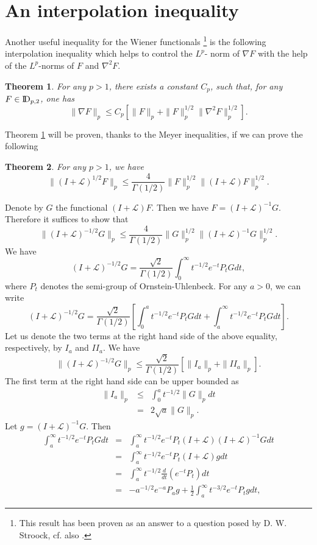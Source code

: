 \documentclass[12pt,a4paper]{book}
\newtheorem{theorem}{Theorem}[section]
\newcommand{\DD}{{\rm I\!D}}
\newcommand{\proof}{\noindent {\bf Proof:\ }}
\begin{document}

\section{An interpolation inequality}
Another useful inequality for the Wiener functionals \footnote{This
  result has been proven as an answer to a question posed by
  D. W. Stroock, cf. also \cite{D-H-U}.} is the following
interpolation inequality which helps to control the $L^p$- norm of
$\nabla F$ with the help of the $L^p$-norms of $F$ and
$\nabla^2 F$.
\begin{theorem}
\label{inter-th}
For any $p>1$, there exists a constant $C_p$, such that, for any $F\in \DD_{p,2}$, one has
$$
\|\nabla F\|_p\leq C_p\left[\|F\|_p+\|F\|_p^{1/2}\|\nabla^2F\|_p^{1/2}\right].
$$
\end{theorem}
Theorem \ref{inter-th}  will be proven, thanks to  the Meyer
inequalities, if we can  prove the following
\begin{theorem}
\label{th6}
For any $p>1$, we have
$$
\|(I+{\mathcal L})^{1/2}F\|_p\leq \frac{4}{\Gamma(1/2)}
  \|F\|_p^{1/2}\|(I+{\mathcal L})F\|^{1/2}_p.
$$
\end{theorem}
\proof
Denote by $G$ the functional $(I+{\mathcal L})F$. Then we have
$F=(I+{\mathcal L})^{-1}G$. Therefore it suffices to show that
$$
\|(I+{\mathcal L})^{-1/2}G\|_p\leq  \frac{4}{\Gamma(1/2)}
\|G\|^{1/2}_p\|(I+{\mathcal L})^{-1}G\|^{1/2}_p.
$$
We have
$$
(I+{\mathcal L})^{-1/2}G=\frac{\sqrt{2}}{\Gamma(1/2)}\int_0^\infty
t^{-1/2}e^{-t}P_t G dt,
$$
where $P_t$ denotes the semi-group of Ornstein-Uhlenbeck. For any
$a>0$, we can write
$$
(I+{\mathcal L})^{-1/2}G=\frac{\sqrt{2}}{\Gamma(1/2)}\left[\int_0^a
t^{-1/2}e^{-t}P_t G dt+\int_a^\infty t^{-1/2}e^{-t}P_t G dt\right].
$$
Let us denote the two terms at the right hand side of the above
equality, respectively, by $I_a$ and $II_a$. We have
$$
\|(I+{\mathcal L})^{-1/2}G\|_p\leq \frac{\sqrt{2}}{\Gamma(1/2)}
[\|I_a\|_p+\|II_a\|_p].
$$
The first term at the right hand side can be upper bounded  as
\begin{eqnarray*}
\|I_a\|_p&\leq & \int_0^a t^{-1/2}\|G\|_p dt\\
&=& 2\sqrt{a}\|G\|_p.
\end{eqnarray*}
Let $g=(I+{\mathcal L})^{-1}G$. Then
\begin{eqnarray*}
\int_a^\infty t^{-1/2}e^{-t}P_t G dt&=&\int_a^\infty t^{-1/2}e^{-t}P_t
(I+{\mathcal L}) (I+{\mathcal L})^{-1}G dt\\
&=&\int_a^\infty t^{-1/2}e^{-t}P_t (I+{\mathcal L})g  dt\\
&=&\int_a^\infty t^{-1/2}\frac{d}{dt}(e^{-t}P_t) dt\\
&=&-a^{-1/2}e^{-a}P_a g+\frac{1}{2}\int_a^\infty t^{-3/2} e^{-t}P_tg dt,
\end{eqnarray*}
\end{document}
